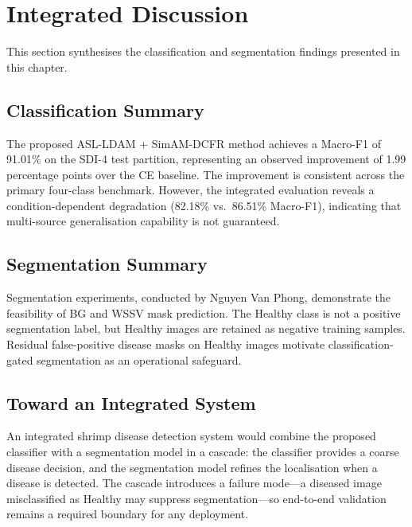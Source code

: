 
\section{Integrated Discussion}
\label{sec:integrated-discussion}

This section synthesises the classification and segmentation findings presented in this chapter.

\subsection{Classification Summary}
\label{sec:discussion-classification}

The proposed ASL-LDAM + SimAM-DCFR method achieves a Macro-F1 of 91.01\% on the SDI-4 test partition, representing an observed improvement of 1.99 percentage points over the CE baseline. The improvement is consistent across the primary four-class benchmark. However, the integrated evaluation reveals a condition-dependent degradation (82.18\% vs.~86.51\% Macro-F1), indicating that multi-source generalisation capability is not guaranteed.

\subsection{Segmentation Summary}
\label{sec:discussion-segmentation}

Segmentation experiments, conducted by Nguyen Van Phong, demonstrate the feasibility of BG and WSSV mask prediction. The Healthy class is not a positive segmentation label, but Healthy images are retained as negative training samples. Residual false-positive disease masks on Healthy images motivate classification-gated segmentation as an operational safeguard.

\subsection{Toward an Integrated System}
\label{sec:discussion-system}

An integrated shrimp disease detection system would combine the proposed classifier with a segmentation model in a cascade: the classifier provides a coarse disease decision, and the segmentation model refines the localisation when a disease is detected. The cascade introduces a failure mode---a diseased image misclassified as Healthy may suppress segmentation---so end-to-end validation remains a required boundary for any deployment.